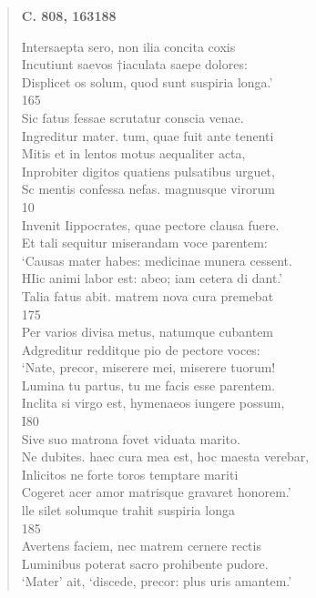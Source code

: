 \documentclass[11pt, a4paper]{report}
\begin{document}
\begin{verse}
     \marginpar{[292]} \begin{center} \textbf{C. 808, 163188} \end{center}Intersaepta sero, non ilia concita coxis \\ Incutiunt saevos †iaculata saepe dolores: \\ Displicet os solum, quod sunt suspiria longa.’ \\ 165 \\ Sic fatus fessae scrutatur conscia venae. \\ Ingreditur mater. tum, quae fuit ante tenenti \\ Mitis et in lentos motus aequaliter acta, \\ Inprobiter digitos quatiens pulsatibus urguet, \\ Sc mentis confessa nefas. magnusque virorum \\ 10 \\ Invenit Iippocrates, quae pectore clausa fuere. \\ Et tali sequitur miserandam voce parentem: \\ ‘Causas mater habes: medicinae munera cessent. \\ HIic animi labor est: abeo; iam cetera di dant.’ \\ Talia fatus abit. matrem nova cura premebat \\ 175 \\ Per varios divisa metus, natumque cubantem \\ Adgreditur redditque pio de pectore voces: \\ ‘Nate, precor, miserere mei, miserere tuorum! \\ Lumina tu partus, tu me facis esse parentem. \\ Inclita si virgo est, hymenaeos iungere possum, \\ I80 \\ Sive suo matrona fovet viduata marito. \\ Ne dubites.  \lbrack haec \rbrack  cura mea est, hoc maesta verebar, \\ Inlicitos ne forte toros temptare mariti \\ Cogeret acer amor matrisque gravaret honorem.’ \\ lle silet solumque trahit suspiria longa \\ 185 \\ Avertens faciem, nec matrem cernere rectis \\ Luminibus poterat sacro prohibente pudore. \\ ‘Mater’ ait, ‘discede, precor: plus uris amantem.’ \\ 

\end{verse}
\end{document}
